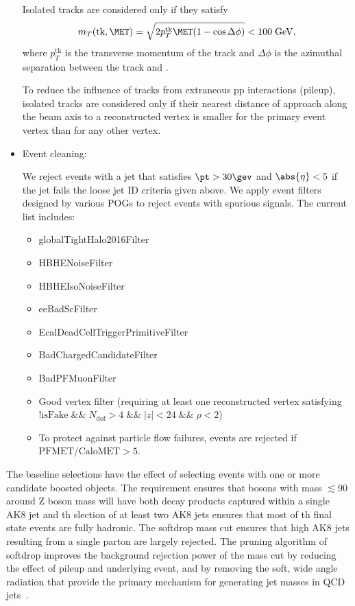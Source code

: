 \begin{itemize}
  Isolated tracks are considered only if they satisfy
  \begin{equation}
    \label{eq:mt_isotk}
    m_T(\mathrm{tk},\met) = \sqrt{2p_{T}^{\mathrm{tk}}\met(1-\cos\Delta\phi)}<100\;\mathrm{GeV},
  \end{equation}
  where $p_{T}^{\mathrm{tk}}$ is the transverse momentum of the track and
  $\Delta\phi$ is the azimuthal separation between the track and \ptvecmiss.

  To reduce the influence of tracks from extraneous pp interactions (pileup),
  isolated tracks are considered only if their nearest distance of approach
  along the beam axis to a reconstructed vertex
  is smaller for the primary event vertex than for any other vertex.
  
\item Event cleaning:

  We reject events with a jet that satisfies $\pt>30\gev$ and   $\abs{\eta}<5$ if the jet fails the loose jet ID criteria given above.
  We apply event filters designed by various POGs to reject events with spurious \MET signals. The current list includes:

  \begin{itemize}
  \item globalTightHalo2016Filter
  \item HBHENoiseFilter
  \item HBHEIsoNoiseFilter
  \item eeBadScFilter
  \item EcalDeadCellTriggerPrimitiveFilter
  \item BadChargedCandidateFilter
  \item BadPFMuonFilter
  \item Good vertex filter (requiring at least one reconstructed vertex satisfying $\text{!isFake}\;\&\&\;N_{\text{dof}} > 4\;\&\&\;|z| < 24 \;\&\&\;\rho < 2$)
  \item To protect against particle flow failures, events are rejected if ${\text{PFMET/CaloMET} > 5}$.
  \end{itemize}

\end{itemize}
The baseline selections have the effect of selecting events with one or more candidate boosted objects.  The
\pt requirement ensures that bosons with mass $\lesssim 90$\gev around Z boson mass will have both decay products captured within 
a single AK8 jet and th slection of at least two AK8 jets ensures that most of th final state events are fully hadronic.  The softdrop mass cut ensures that high \pt AK8 jets resulting from a single parton are largely rejected.
The pruning algorithm of softdrop improves the background rejection power of the mass cut by reducing the effect of pileup 
and underlying event, and by removing the soft, wide angle radiation that provide the primary mechanism for generating 
jet masses in QCD jets~\cite{JetSub:Prune}.

